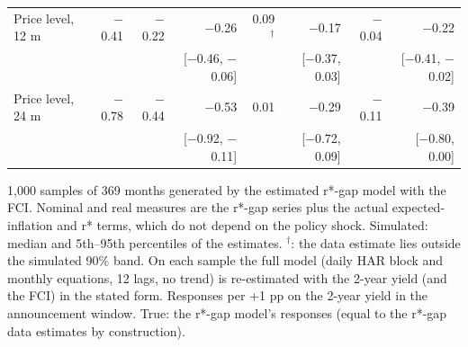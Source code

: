 \begin{table}[H]
\begin{tabular}{lrrrrrrr}
\quad Price level, 12 m & $-$0.41 & $-$0.22 & $-$0.26 & 0.09$^{\dagger}$ & $-$0.17 & $-$0.04 & $-$0.22\\
 &  &  & {\scriptsize [$-$0.46, $-$0.06]} &  & {\scriptsize [$-$0.37, 0.03]} &  & {\scriptsize [$-$0.41, $-$0.02]}\\
\quad Price level, 24 m & $-$0.78 & $-$0.44 & $-$0.53 & 0.01 & $-$0.29 & $-$0.11 & $-$0.39\\
 &  &  & {\scriptsize [$-$0.92, $-$0.11]} &  & {\scriptsize [$-$0.72, 0.09]} &  & {\scriptsize [$-$0.80, 0.00]}\\
\bottomrule\end{tabular}
\par\smallskip\parbox{0.96\linewidth}{\scriptsize 1,000 samples of 369 months generated by the estimated r*-gap model with the FCI. Nominal and real measures are the r*-gap series plus the actual expected-inflation and r* terms, which do not depend on the policy shock. Simulated: median and 5th--95th percentiles of the estimates. $^{\dagger}$: the data estimate lies outside the simulated 90\% band. On each sample the full model (daily HAR block and monthly equations, 12 lags, no trend) is re-estimated with the 2-year yield (and the FCI) in the stated form. Responses per +1 pp on the 2-year yield in the announcement window. True: the r*-gap model's responses (equal to the r*-gap data estimates by construction).}
\end{table}

